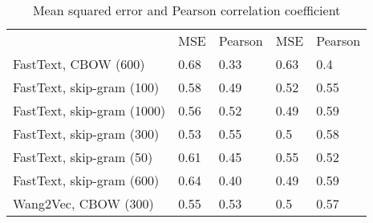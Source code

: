 \documentclass[12pt]{article}
\begin{document}
\begin{table}[]
	\centering
	\caption{Mean squared error and Pearson correlation coefficient }
		\begin{tabular}{lllll}
		& MSE & Pearson & MSE & Pearson \\
		FastText, CBOW (600)       & 0.68              & 0.33                  & 0.63                 & 0.4                      \\
		FastText, skip-gram (100)  & 0.58              & 0.49                  & 0.52                 & 0.55                     \\
		FastText, skip-gram (1000) & 0.56              & 0.52                  & 0.49                 & 0.59                     \\
		FastText, skip-gram (300)  & 0.53              & 0.55                  & 0.5                  & 0.58                     \\
		FastText, skip-gram (50)   & 0.61              & 0.45                  & 0.55                 & 0.52                     \\
		FastText, skip-gram (600)  & 0.64              & 0.40                  & 0.49                 & 0.59                     \\
		Wang2Vec, CBOW (300)       & 0.55              & 0.53                  & 0.5                  & 0.57                    
	\end{tabular}
\end{table}


\renewcommand\refname{References}


\end{document}
